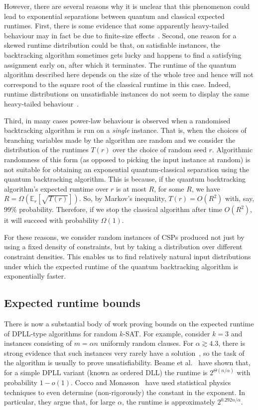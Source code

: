 \documentclass[11pt]{article}
\newcommand{\E}{\mathbb{E}}
\begin{document}
However, there are several reasons why it is unclear that this phenomenon could lead to exponential separations between quantum and classical expected runtimes. First, there is some evidence that some apparently heavy-tailed behaviour may in fact be due to finite-size effects~\cite{cocco02,cocco05}. Second, one reason for a skewed runtime distribution could be that, on satisfiable instances, the backtracking algorithm sometimes gets lucky and happens to find a satisfying assignment early on, after which it terminates. The runtime of the quantum algorithm described here depends on the size of the whole tree and hence will not correspond to the square root of the classical runtime in this case. Indeed, runtime distributions on unsatisfiable instances do not seem to display the same heavy-tailed behaviour~\cite{rish97,gomes04}.

Third, in many cases power-law behaviour is observed when a randomised backtracking algorithm is run on a {\em single} instance. That is, when the choices of branching variables made by the algorithm are random and we consider the distribution of the runtimes $T(r)$ over the choice of random seed $r$. Algorithmic randomness of this form (as opposed to picking the input instance at random) is not suitable for obtaining an exponential quantum-classical separation using the quantum backtracking algorithm. This is because, if the quantum backtracking algorithm's expected runtime over $r$ is at most $R$, for some $R$, we have $R = \Omega(\E_r[\sqrt{T(r)}])$. So, by Markov's inequality, $T(r) = O(R^2)$ with, say, 99\% probability. Therefore, if we stop the classical algorithm after time $O(R^2)$, it will succeed with probability $\Omega(1)$.

For these reasons, we consider random instances of CSPs produced not just by using a fixed density of constraints, but by taking a distribution over different constraint densities. This enables us to find relatively natural input distributions under which the expected runtime of the quantum backtracking algorithm is exponentially faster.


\subsection{Expected runtime bounds}

There is now a substantial body of work proving bounds on the expected runtime of DPLL-type algorithms for random $k$-SAT. For example, consider $k=3$ and instances consisting of $m = \alpha n$ uniformly random clauses. For $\alpha \gtrsim 4.3$, there is strong evidence that such instances very rarely have a solution~\cite{selman96}, so the task of the algorithm is usually to prove unsatisfiability. Beame et al.~\cite{beame02} have shown that, for a simple DPLL variant (known as ordered DLL) the runtime is $2^{\Theta(n/\alpha)}$ with probability $1-o(1)$. Cocco and Monasson~\cite{cocco01,cocco01a} have used statistical physics techniques to even determine (non-rigorously) the constant in the exponent. In particular, they argue that, for large $\alpha$, the runtime is approximately $2^{0.292n/ \alpha}$.
\end{document}
